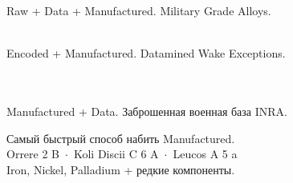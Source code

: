 \begin{tcolorbox}[edbox-titled, title=2.~LOOKOUT~MILITARY]
\\
\\
{\color{edgraytext}\fontsize{6}{7}\selectfont
  Raw + Data + Manufactured. Military Grade Alloys.}
\end{tcolorbox}

\begin{tcolorbox}[edbox-titled, title=3.~TAYLOR KEEP]
\\
{\color{edgraytext}\fontsize{6}{7}\selectfont
  Encoded + Manufactured. Datamined Wake Exceptions.}
\end{tcolorbox}

\begin{tcolorbox}[edbox-titled, title=4.~CARMICHAEL POINT]
\\
\\
{\color{edgraytext}\fontsize{6}{7}\selectfont
  Manufactured + Data. Заброшенная военная база INRA.}
\end{tcolorbox}

\begin{tcolorbox}[edbox-titled, title=5.~CRASHED ANACONDA]
{\color{edgraytext}\fontsize{6}{7}\selectfont
  Самый быстрый способ набить Manufactured.}\\[0.5mm]
{\fontsize{6.5}{8}\selectfont
  Orrere 2 B~$\cdot$~Koli Discii C 6 A~$\cdot$~Leucos A 5 a}\\
{\color{edgraytext}\fontsize{6}{7}\selectfont
  Iron, Nickel, Palladium + редкие компоненты.}
\end{tcolorbox}
